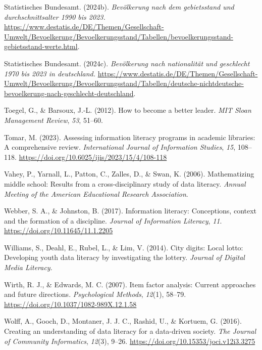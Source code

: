 \documentclass[
  12pt,
  a4paper,
  twoside]{article}
\newlength{\cslhangindent}
\newenvironment{CSLReferences}[2] %
 {\begin{list}{}{%
  \setlength{\itemindent}{0pt}
  \setlength{\leftmargin}{0pt}
  \setlength{\parsep}{0pt}
  \ifodd #1
   \setlength{\leftmargin}{\cslhangindent}
   \setlength{\itemindent}{-1\cslhangindent}
  \fi
  \setlength{\itemsep}{#2\baselineskip}}}
 {\end{list}}
\begin{document}
\begin{CSLReferences}{1}{0}
Statistisches Bundesamt. (2024b). \emph{Bevölkerung nach dem gebietsstand und durchschnitts­alter 1990 bis 2023.} \url{https://www.destatis.de/DE/Themen/Gesellschaft-Umwelt/Bevoelkerung/Bevoelkerungsstand/Tabellen/bevoelkerungsstand-gebietsstand-werte.html}.

Statistisches Bundesamt. (2024c). \emph{Bevölkerung nach nationalität und geschlecht 1970 bis 2023 in deutschland.} \url{https://www.destatis.de/DE/Themen/Gesellschaft-Umwelt/Bevoelkerung/Bevoelkerungsstand/Tabellen/deutsche-nichtdeutsche-bevoelkerung-nach-geschlecht-deutschland}.

Toegel, G., \& Barsoux, J.-L. (2012). How to become a better leader. \emph{MIT Sloan Management Review}, \emph{53}, 51--60.

Tomar, M. (2023). Assessing information literacy programs in academic libraries: A comprehensive review. \emph{International Journal of Information Studies}, \emph{15}, 108--118. \url{https://doi.org/10.6025/ijis/2023/15/4/108-118}

Vahey, P., Yarnall, L., Patton, C., Zalles, D., \& Swan, K. (2006). Mathematizing middle school: Results from a cross-disciplinary study of data literacy. \emph{Annual Meeting of the American Educational Research Association}.

Webber, S. A., \& Johnston, B. (2017). Information literacy: Conceptions, context and the formation of a discipline. \emph{Journal of Information Literacy}, \emph{11}. \url{https://doi.org/10.11645/11.1.2205}

Williams, S., Deahl, E., Rubel, L., \& Lim, V. (2014). City digits: Local lotto: Developing youth data literacy by investigating the lottery. \emph{Journal of Digital Media Literacy}.

Wirth, R. J., \& Edwards, M. C. (2007). Item factor analysis: Current approaches and future directions. \emph{Psychological Methods}, \emph{12}(1), 58--79. \url{https://doi.org/10.1037/1082-989X.12.1.58}

Wolff, A., Gooch, D., Montaner, J. J. C., Rashid, U., \& Kortuem, G. (2016). Creating an understanding of data literacy for a data-driven society. \emph{The Journal of Community Informatics}, \emph{12}(3), 9--26. \url{https://doi.org/10.15353/joci.v12i3.3275}

\end{CSLReferences}
\end{document}
